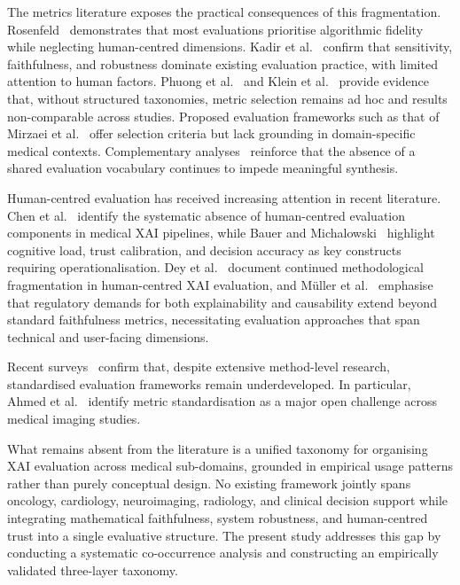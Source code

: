 The metrics literature exposes the practical consequences of this
fragmentation. Rosenfeld~\cite{rosenfeld2021better} demonstrates that most
evaluations prioritise algorithmic fidelity while neglecting human-centred
dimensions. Kadir et al.~\cite{kadir2023evaluation} confirm that sensitivity,
faithfulness, and robustness dominate existing evaluation practice, with limited
attention to human factors. Phuong et al.~\cite{phuong2023benchmarking} and
Klein et al.~\cite{Klein2024NavigatingTM} provide evidence that, without
structured taxonomies, metric selection remains ad hoc and results
non-comparable across studies. Proposed evaluation frameworks such as that of
Mirzaei et al.~\cite{mirzaei2023xai} offer selection criteria but lack
grounding in domain-specific medical contexts. Complementary
analyses~\cite{coroama2022evaluation,boggust2023saliency} reinforce that the
absence of a shared evaluation vocabulary continues to impede meaningful
synthesis.

Human-centred evaluation has received increasing attention in recent literature.
Chen et al.~\cite{chen2022explainable} identify the systematic absence of
human-centred evaluation components in medical XAI pipelines, while Bauer and
Michalowski~\cite{bauer2025human} highlight cognitive load, trust calibration,
and decision accuracy as key constructs requiring operationalisation. Dey et
al.~\cite{dey2022human} document continued methodological fragmentation in
human-centred XAI evaluation, and M{\"u}ller et
al.~\cite{muller2022explainability} emphasise that regulatory demands for both
explainability and causability extend beyond standard faithfulness metrics,
necessitating evaluation approaches that span technical and user-facing
dimensions.

Recent surveys~\cite{houssein2025explainable,zhang2026comprehensive,Ahmed2026XAI}
confirm that, despite extensive method-level research, standardised evaluation
frameworks remain underdeveloped. In particular, Ahmed et
al.~\cite{Ahmed2026XAI} identify metric standardisation as a major open
challenge across medical imaging studies.

What remains absent from the literature is a unified taxonomy for organising
XAI evaluation across medical sub-domains, grounded in empirical usage
patterns rather than purely conceptual design. No existing framework jointly
spans oncology, cardiology, neuroimaging, radiology, and clinical decision
support while integrating mathematical faithfulness, system robustness, and
human-centred trust into a single evaluative structure. The present study
addresses this gap by conducting a systematic co-occurrence analysis and
constructing an empirically validated three-layer taxonomy.
